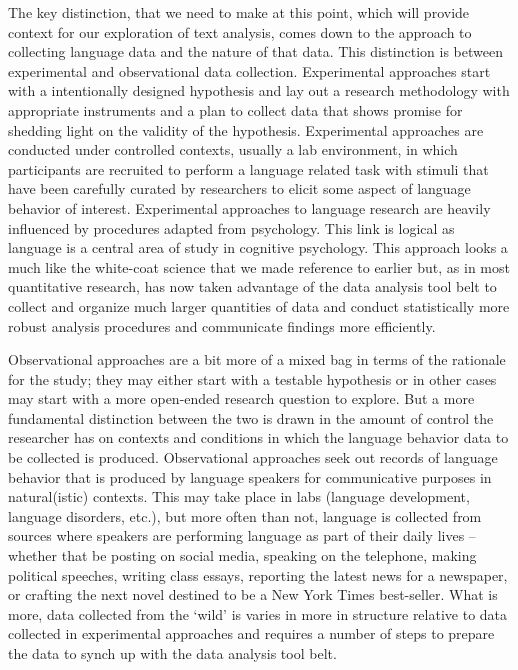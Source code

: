 \documentclass[
]{article}
\begin{document}
The key distinction, that we need to make at this point, which will provide context for our exploration of text analysis, comes down to the approach to collecting language data and the nature of that data. This distinction is between experimental and observational data collection. Experimental approaches start with a intentionally designed hypothesis and lay out a research methodology with appropriate instruments and a plan to collect data that shows promise for shedding light on the validity of the hypothesis. Experimental approaches are conducted under controlled contexts, usually a lab environment, in which participants are recruited to perform a language related task with stimuli that have been carefully curated by researchers to elicit some aspect of language behavior of interest. Experimental approaches to language research are heavily influenced by procedures adapted from psychology. This link is logical as language is a central area of study in cognitive psychology. This approach looks a much like the white-coat science that we made reference to earlier but, as in most quantitative research, has now taken advantage of the data analysis tool belt to collect and organize much larger quantities of data and conduct statistically more robust analysis procedures and communicate findings more efficiently.

Observational approaches are a bit more of a mixed bag in terms of the rationale for the study; they may either start with a testable hypothesis or in other cases may start with a more open-ended research question to explore. But a more fundamental distinction between the two is drawn in the amount of control the researcher has on contexts and conditions in which the language behavior data to be collected is produced. Observational approaches seek out records of language behavior that is produced by language speakers for communicative purposes in natural(istic) contexts. This may take place in labs (language development, language disorders, etc.), but more often than not, language is collected from sources where speakers are performing language as part of their daily lives --whether that be posting on social media, speaking on the telephone, making political speeches, writing class essays, reporting the latest news for a newspaper, or crafting the next novel destined to be a New York Times best-seller. What is more, data collected from the `wild' is varies in more in structure relative to data collected in experimental approaches and requires a number of steps to prepare the data to synch up with the data analysis tool belt.
\end{document}
